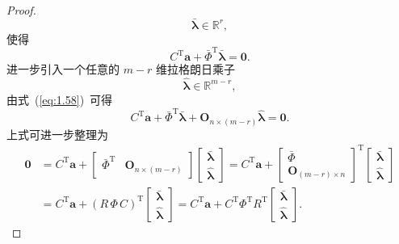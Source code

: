 \begin{proof}
\begin{equation}\label{eq:1.57}
\bar{\boldsymbol{\lambda}} \in \mathbb{R}^r,
\end{equation}
使得
\begin{equation}\label{eq:1.58}
C^{\mathrm{T}} \boldsymbol{a} + \bar{\Phi}^{\mathrm{T}} \bar{\boldsymbol{\lambda}} = \boldsymbol{0}.
\end{equation}
进一步引入一个任意的 $m-r$ 维拉格朗日乘子
\begin{equation}\label{eq:1.59}
\hat{\boldsymbol{\lambda}} \in \mathbb{R}^{m-r},
\end{equation}
由式~(\ref{eq:1.58})~可得
\begin{equation}\label{eq:1.60}
C^{\mathrm{T}} \boldsymbol{a} + \bar{\Phi}^{\mathrm{T}} \bar{\boldsymbol{\lambda}} + \boldsymbol{O}_{n \times (m-r)} \hat{\boldsymbol{\lambda}} = \boldsymbol{0}.
\end{equation}
上式可进一步整理为
\begin{equation}\label{eq:1.61}
\begin{aligned}
\boldsymbol{0} &= C^{\mathrm{T}} \boldsymbol{a} + \begin{bmatrix} \bar{\Phi}^{\mathrm{T}} & \boldsymbol{O}_{n \times (m-r)} \end{bmatrix} \!\begin{bmatrix} \bar{\boldsymbol{\lambda}} \\ \hat{\boldsymbol{\lambda}} \end{bmatrix} = C^{\mathrm{T}} \boldsymbol{a} + \begin{bmatrix} \bar{\Phi} \\ \boldsymbol{O}_{(m-r) \times n} \end{bmatrix}^{\!\mathrm{T}} \!\begin{bmatrix} \bar{\boldsymbol{\lambda}} \\ \hat{\boldsymbol{\lambda}} \end{bmatrix} \\
&= C^{\mathrm{T}} \boldsymbol{a} + (R\,\Phi\, C)^{\mathrm{T}} \!\begin{bmatrix} \bar{\boldsymbol{\lambda}} \\ \hat{\boldsymbol{\lambda}} \end{bmatrix} = C^{\mathrm{T}} \boldsymbol{a} + C^{\mathrm{T}} \Phi^{\mathrm{T}} R^{\mathrm{T}} \!\begin{bmatrix} \bar{\boldsymbol{\lambda}} \\ \hat{\boldsymbol{\lambda}} \end{bmatrix}.
\end{aligned}

\end{equation}
\end{proof}
